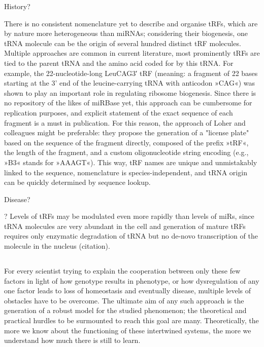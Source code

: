 History?

There is no consistent nomenclature yet to describe and organise tRFs, which are by nature more heterogeneous than miRNAs; considering their biogenesis, one tRNA molecule can be the origin of several hundred distinct tRF molecules. Multiple approaches are common in current literature, most prominently tRFs are tied to the parent tRNA and the amino acid coded for by this tRNA. For example, the 22-nucleotide-long LeuCAG3′ tRF (meaning: a fragment of 22 bases starting at the 3' end of the leucine-carrying tRNA with anticodon »CAG«) was shown to play an important role in regulating ribosome biogenesis\cite{Kim2017}. Since there is no repository of the likes of miRBase yet, this approach can be cumbersome for replication purposes, and explicit statement of the exact sequence of each fragment is a must in publication. For this reason, the approach of Loher and colleagues\cite{Loher2017} might be preferable: they propose the generation of a "license plate" based on the sequence of the fragment directly, composed of the prefix »tRF«, the length of the fragment, and a custom oligonucleotide string encoding (e.g., »B3« stands for »AAAGT«). This way, tRF names are unique and unmistakably linked to the sequence, nomenclature is species-independent, and tRNA origin can be quickly determined by sequence lookup.

Disease?

? Levels of tRFs may be modulated even more rapidly than levels of miRs, since tRNA molecules are very abundant in the cell and generation of mature tRFs requires only enzymatic degradation of tRNA but no de-novo transcription of the molecule in the nucleus (citation).

\subsection[Nested Multimodal Transcriptional Interactions - The Need for Connectomics]{}
For every scientist trying to explain the cooperation between only these few factors in light of how genotype results in phenotype, or how dysregulation of any one factor leads to loss of homeostasis and eventually disease, multiple levels of obstacles have to be overcome. The ultimate aim of any such approach is the generation of a robust model for the studied phenomenon; the theoretical and practical hurdles to be surmounted to reach this goal are many. Theoretically, the more we know about the functioning of these intertwined systems, the more we understand how much there is still to learn. 

